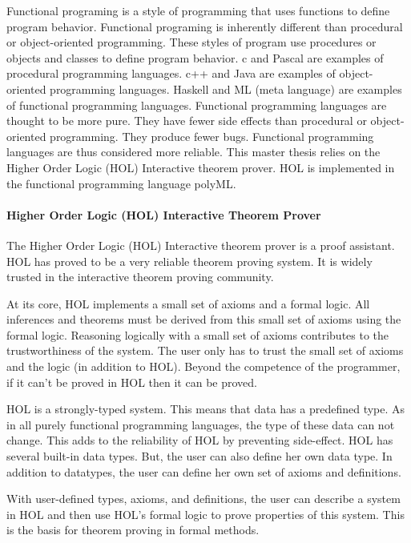 \documentclass[../../main/main.tex]{subfiles}
\begin{document}
Functional programing is a style of programming that uses functions to define program behavior.  Functional programing is inherently different than procedural or object-oriented programming. These styles of program use procedures or objects and classes to define program behavior.  c  and Pascal are examples of procedural programming languages.  c++ and Java are examples of object-oriented programming languages.  Haskell and ML (meta language) are examples of functional programming languages.  Functional programming languages are thought to be more pure.  They have fewer side effects than procedural or object-oriented programming.  They produce fewer bugs.  Functional programming languages are thus considered more reliable.   
This master thesis relies on the Higher Order Logic (HOL) Interactive theorem prover.  HOL is implemented in the functional programming language polyML.

\paragraph*{Higher Order Logic (HOL) Interactive Theorem Prover}
The Higher Order Logic (HOL) Interactive theorem prover is a proof assistant.  HOL has proved to be a very reliable theorem proving system.  It is widely trusted in the interactive theorem proving community.

At its core, HOL implements a small set of axioms and a formal logic.  All inferences and theorems must be derived from this small set of axioms using the formal logic.  Reasoning logically with a small set of axioms contributes to the trustworthiness of the system.  The user only has to trust the small set of axioms and the logic (in addition to HOL).  Beyond the competence of the programmer, if it can't be proved in HOL then it can be proved.  

HOL is a strongly-typed system.  This means that data has a predefined type.  As in all purely functional programming languages, the type of these data can not change.  This adds to the reliability of HOL by preventing side-effect. HOL has several built-in data types.  But, the user can also define her own data type.   In addition to datatypes, the user can define her own set of axioms and definitions.  

With user-defined types, axioms, and definitions, the user can describe a system in HOL and then use HOL's formal logic to prove properties of this system.  This is the basis for theorem proving in formal methods.
\end{document}
